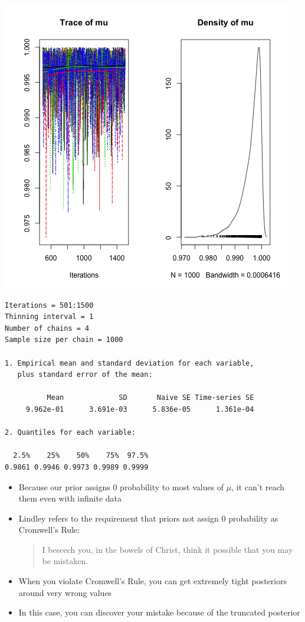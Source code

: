 \documentclass{beamer}
\begin{document}
\begin{frame}[fragile]
  \begin{center}
    \includegraphics[scale = 0.4]{../graphs/normal/plot4.png}
  \end{center}
\end{frame}

\begin{frame}[fragile]
  \begin{verbatim}
Iterations = 501:1500
Thinning interval = 1 
Number of chains = 4 
Sample size per chain = 1000 

1. Empirical mean and standard deviation for each variable,
   plus standard error of the mean:

          Mean             SD       Naive SE Time-series SE 
     9.962e-01      3.691e-03      5.836e-05      1.361e-04 

2. Quantiles for each variable:

  2.5%    25%    50%    75%  97.5% 
0.9861 0.9946 0.9973 0.9989 0.9999 
  \end{verbatim}
\end{frame}

\begin{frame}[fragile]
  \begin{itemize}
    \item{Because our prior assigns 0 probability to most values of $\mu$, it can't reach them even with infinite data}
    \item{Lindley refers to the requirement that priors not assign 0 probability as Cromwell's Rule:}
  \begin{quote}
I beseech you, in the bowels of Christ, think it possible that you may be mistaken.
  \end{quote}
  \item{When you violate Cromwell's Rule, you can get extremely tight posteriors around very wrong values}
  \item{In this case, you can discover your mistake because of the truncated posterior}
  \end{itemize}
\end{frame}
\end{document}
